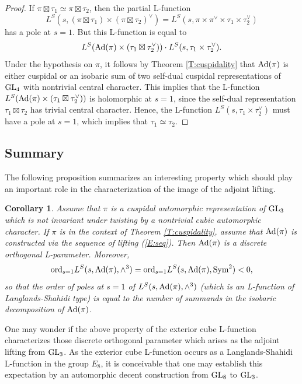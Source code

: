 \documentclass[11pt]{amsart}
\theoremstyle{plain}
\newtheorem{cor}[equation]{Corollary}
\numberwithin{equation}{section}
\def\GL{{\rm GL}}
\begin{document}
\begin{proof}
If  $\pi \boxtimes \tau_1 \simeq \pi \boxtimes \tau_2$, then the partial L-function
\[  L^S(s,  (\pi \boxtimes \tau_1) \times (\pi \boxtimes \tau_2)^{\vee}) = L^S(s, \pi \times \pi^{\vee} \times \tau_1 \times \tau_2^{\vee}) \]
has a pole at $s=1$.  But this L-function is equal to
\[  L^S({\rm Ad}(\pi) \times (\tau_1 \boxtimes \tau_2^{\vee})) \cdot  L^S(s, \tau_1 \times \tau_2^{\vee}). \]
Under the hypothesis on $\pi$, it follows by Theorem \ref{T:cuspidality} that ${\rm Ad}(\pi)$ is either cuspidal or an isobaric sum of two self-dual cuspidal representations of $\GL_4$ with nontrivial central character.
This implies that the L-function $L^S({\rm Ad}(\pi) \times (\tau_1 \boxtimes \tau_2^{\vee}))$ is holomorphic at $s=1$, since the self-dual representation $\tau_1 \boxtimes \tau_2$ has trivial central character. 
Hence, the L-function $L^S(s, \tau_1 \times \tau_2^{\vee})$ must have a pole at $s=1$, which implies that $\tau_1 \simeq \tau_2$.
\end{proof}
\vskip 5pt


\subsection{\bf Summary}
The following proposition summarizes an interesting property  which should play an important role in the characterization of the image of the adjoint lifting.
\vskip 5pt

\begin{cor}
Assume that $\pi$ is a cuspidal automorphic representation of $\GL_3$ which is not invariant under twisting by a nontrivial cubic automorphic character.
If $\pi$ is in the context of Theorem \ref{T:cuspidality}, assume that ${\rm Ad}(\pi)$ is constructed via the sequence of lifting (\ref{E:seq}). Then
${\rm Ad}(\pi)$ is a discrete orthogonal L-parameter.  Moreover, 
\[ {\rm ord}_{s=1} L^S( s, {\rm Ad}(\pi), \wedge^3) = {\rm ord}_{s=1} L^S(s, {\rm Ad}(\pi), {\rm Sym}^2) < 0,  \]
so that the order of poles at $s=1$ of $L^S(s, {\rm Ad}(\pi), \wedge^3)$  (which is an L-function of Langlands-Shahidi type) is equal to the number of summands in the isobaric decomposition of ${\rm Ad}(\pi)$.
\end{cor}

One may wonder if the above property of the exterior cube L-function characterizes those discrete orthogonal parameter which arises as the adjoint lifting from $\GL_3$. As the exterior cube L-function occurs as a Langlands-Shahidi L-function in the group $E_8$, it is conceivable that one may establish this expectation by an automorphic decent construction from $\GL_8$ to $\GL_3$.
\vskip 10pt
\end{document}
